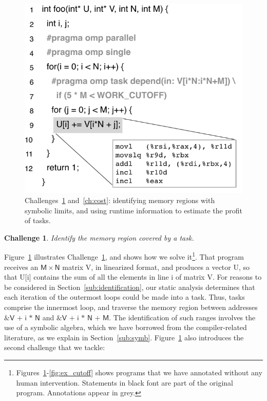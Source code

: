 \documentclass[sigplan,10pt,review,anonymous]{acmart}
\newtheorem{Challenge}{Challenge}[section]
\begin{document}
\begin{figure}[h!]
\begin{center}
\includegraphics[width=0.95\columnwidth]{images/ex_Regions}
\caption{Challenges~\ref{ch:Regions} and~\ref{ch:cost}: identifying memory regions
with symbolic limits, and using runtime information to estimate the profit of
tasks.}
\label{fig:ex_Regions}
\end{center}
\end{figure}

\begin{Challenge}
\label{ch:Regions}
Identify the memory region covered by a task.
\end{Challenge}

Figure~\ref{fig:ex_Regions} illustrates Challenge~\ref{ch:Regions}, and shows
how we solve it\footnote{Figures~\ref{fig:ex_Regions}-\ref{fig:ex_cutoff} shows
programs that we have annotated without any human intervention.
Statements in black font are part of the original program.
Annotations appear in grey.}.
That program receives an $\mathsf{M}\times\mathsf{N}$ matrix \textsf{V}, in
linearized format, and produces a vector \textsf{U}, so that \textsf{U[i]}
contains the sum of all the elements in line \textsf{i} of matrix \textsf{V}.
For reasons to be considered in Section~\ref{sub:identification},
our static analysis determines that each iteration of the outermost loops
could be made into a task.
Thus, tasks comprise the innermost loop, and traverse the memory region
between addresses $\textsf{\&V + i * N}$ and $\textsf{\&V + i * N + M}$.
The identification of such ranges involves the use of a symbolic algebra,
which we have borrowed from the compiler-related literature, as we
explain in Section~\ref{sub:symb}.
Figure~\ref{fig:ex_Regions} also introduces the second challenge that we
tackle:
\end{document}
